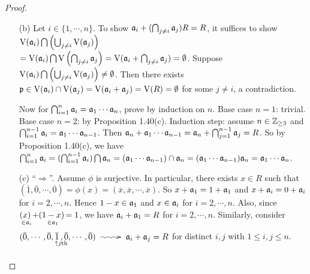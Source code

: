 \begin{proof}
    \begin{enumerate}
        \item [(b)]
            Let $i \in \{1,\cdots,n\}$. To show $\mathfrak{a}_i + (\bigcap_{j \neq i}\mathfrak{a}_j)R = R$, it suffices to show $\operatorname{V}(\mathfrak{a}_i) \bigcap \left(\bigcup_{j \neq i} \operatorname{V}(\mathfrak{a}_j)\right)$ \\ 
            $=\operatorname{V}(\mathfrak{a}_i) \bigcap \operatorname{V}\left(\bigcap_{j \neq i} \mathfrak{a}_j\right) = \operatorname{V}(\mathfrak{a}_i + \bigcap_{j \neq i} \mathfrak{a}_j) = \emptyset$. Suppose $\operatorname{V}(\mathfrak{a}_i) \bigcap \left(\bigcup_{j \neq i}\operatorname{V}(\mathfrak{a}_j)\right) \neq \emptyset$. Then there exists $\mathfrak{p} \in \operatorname{V}(\mathfrak{a}_i) \cap \operatorname{V}(\mathfrak{a}_j) = \operatorname{V}(\mathfrak{a}_i + \mathfrak{a}_j) = \operatorname{V}(R) = \emptyset$ for some $j \neq i$, a contradiction. \par
            Now for $\bigcap_{i=1}^n \mathfrak{a}_i = \mathfrak{a}_1 \cdots \mathfrak{a}_n$, prove by induction on $n$. Base case $n = 1$: trivial. Base case $n = 2$: by Proposition 1.40(c). Induction step: assume $n \in \mathbb{Z}_{\geq 3}$ and $\bigcap_{i=1}^{n-1}\mathfrak{a}_i = \mathfrak{a}_1 \cdots \mathfrak{a}_{n-1}$. Then $\mathfrak{a}_n + \mathfrak{a}_1 \cdots \mathfrak{a}_{n-1} = \mathfrak{a}_n + \bigcap_{j=1}^{n-1} \mathfrak{a}_j = R$. So by Proposition 1.40(c), we have $\bigcap_{i=1}^n \mathfrak{a}_i = (\bigcap_{i=1}^{n-1} \mathfrak{a}_i) \bigcap \mathfrak{a}_n = (\mathfrak{a}_1 \cdots \mathfrak{a}_{n-1}) \cap \mathfrak{a}_n = (\mathfrak{a}_1 \cdots \mathfrak{a}_{n-1})\mathfrak{a}_n = \mathfrak{a}_1 \cdots \mathfrak{a}_n$. 
        \item [(c)]
            ``$\Rightarrow$''. Assume $\phi$ is surjective. In particular, there exists $x \in R$ such that $(\overbar 1,\overbar 0,\cdots,\overbar 0) = \phi(x) = (\overbar x, \overbar x, \cdots, \overbar x)$. So $x+\mathfrak{a}_1 = 1+\mathfrak{a}_1$ and $x+\mathfrak{a}_i = 0 + \mathfrak{a}_i$ for $i = 2,\cdots,n$. Hence $1-x \in \mathfrak{a}_1$ and $x \in \mathfrak{a}_i$ for $i = 2,\cdots,n$. Also, since $\mathpunct{\underset{\mathclap{\substack{\ \in \ffa_i \\ \textstyle }}}{(x)}} + \mathpunct{\underset{\mathclap{\substack{\ \in \ffa_1 \\ \textstyle }}}{(1-x)}} = 1$, we have $\mathfrak{a}_i + \mathfrak{a}_1 = R$ for $i = 2,\cdots, n$. Similarly, consider $(\overbar 0, \cdots, \overbar 0, \mathpunct{\underset{\mathclap{\substack{\ \ \ \uparrow j\text{th} \\ \textstyle }}}{\overbar 1}}, \overbar 0, \cdots, \overbar 0) \xymatrix{{}\ar@{~>}[r]&{}} \ffa_i + \ffa_j = R$ for distinct $i,j$ with $1 \leq i,j \leq n$. \\

\end{enumerate}
\end{proof}
